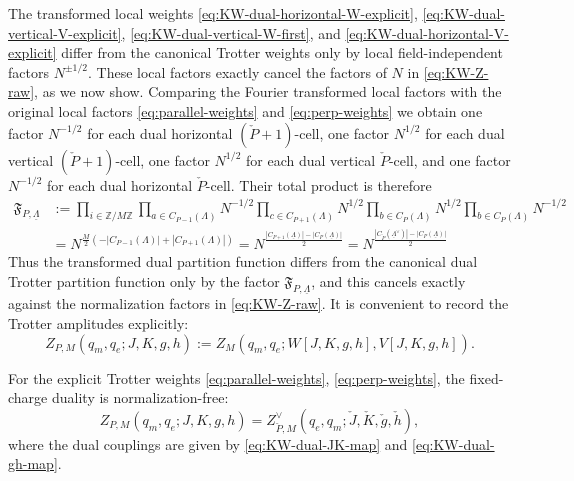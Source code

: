 The transformed local weights \eqref{eq:KW-dual-horizontal-W-explicit},
\eqref{eq:KW-dual-vertical-V-explicit}, \eqref{eq:KW-dual-vertical-W-first}, and
\eqref{eq:KW-dual-horizontal-V-explicit} differ from the canonical Trotter weights only by
local field-independent factors \(N^{\pm 1/2}\). These local factors exactly cancel the factors of $N$ in \eqref{eq:KW-Z-raw}, as we now show. Comparing the
Fourier transformed local factors with the original local factors
\eqref{eq:parallel-weights} and \eqref{eq:perp-weights} we obtain one factor \(N^{-1/2}\)
for each dual horizontal \((\check P+1)\)-cell, one factor \(N^{1/2}\) for each dual
vertical \((\check P+1)\)-cell, one factor \(N^{1/2}\) for each dual vertical
\(\check P\)-cell, and one factor \(N^{-1/2}\) for each dual horizontal \(\check P\)-cell.
Their total product is therefore
\begin{equation}
	\begin{aligned}
		\mathfrak F_{P,\underline\Lambda}
		&:=
		\prod_{i\in \mathbb Z/M\mathbb Z}
		\prod_{a\in C_{P-1}(\Lambda)}N^{-1/2}
		\prod_{c\in C_{P+1}(\Lambda)}N^{1/2}
		\prod_{b\in C_P(\Lambda)}N^{1/2}
		\prod_{b\in C_P(\Lambda)}N^{-1/2}
		\\
		&=
		N^{\frac{M}{2}\left(-|C_{P-1}(\Lambda)|+|C_{P+1}(\Lambda)|\right)}
		=
		N^{\frac{|C_{P+1}(\underline\Lambda)|-|C_P(\underline\Lambda)|}{2}}
		=
		N^{\frac{|C_{\check P}(\underline\Lambda^\vee)|-|C_P(\underline\Lambda)|}{2}}
	\end{aligned}
	\label{eq:KW-local-factor-product}
\end{equation}
Thus the transformed dual partition function differs from the canonical dual Trotter
partition function only by the factor \(\mathfrak F_{P,\underline\Lambda}\), and this
cancels exactly against the normalization factors in
\eqref{eq:KW-Z-raw}. It is convenient to record the Trotter amplitudes explicitly:
\begin{equation}
	Z_{P,M}(q_m,q_e;J,K,g,h)
	:=
	Z_M(q_m,q_e;W[J,K,g,h],V[J,K,g,h]).
	\label{eq:KW-Trotter-fixed-charge-def}
\end{equation}

\begin{theorem}
	\label{thm:KW-Trotter-duality}
	For the explicit Trotter weights \eqref{eq:parallel-weights}, \eqref{eq:perp-weights}, the
	fixed-charge duality is normalization-free:
	\begin{equation}
		Z_{P,M}(q_m,q_e;J,K,g,h)
		=
		Z_{\check P,M}^\vee(q_e,q_m;\check J,\check K,\check g,\check h),
		\label{eq:KW-Trotter-fixed-charge-duality}
	\end{equation}
	where the dual couplings are given by \eqref{eq:KW-dual-JK-map} and
	\eqref{eq:KW-dual-gh-map}.
\end{theorem}

